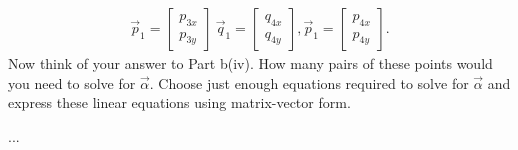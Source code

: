 \documentclass[11pt]{article}
\begin{document}
\begin{enumerate}
\begin{enumerate}
\[\begin{aligned}
                              \vec p_1 = \begin{bmatrix}
                                            p_{3x} \\
                                            p_{3y}
                                       \end{bmatrix} \
                              \vec q_1 = \begin{bmatrix}
                                            q_{4x} \\
                                            q_{4y}
                                       \end{bmatrix},
                              \vec p_1 = \begin{bmatrix}
                                            p_{4x} \\
                                            p_{4y}
                                       \end{bmatrix}.
                        \end{aligned}\]
                Now think of your answer to Part b(iv). How many pairs of these points would you need to solve for
                $\vec \alpha$. Choose just enough equations required to solve for $\vec \alpha$ and express these linear equations using
                matrix-vector form.
                \begin{Answer}
                        ...
                \end{Answer}
       \end{enumerate}
   
         
   

\end{enumerate}
\end{document}
